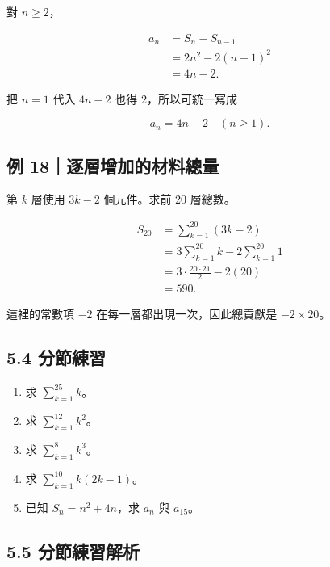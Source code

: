 \documentclass[11pt,a4paper]{article}
\providecommand{\tightlist}{%
  \setlength{\itemsep}{0pt}\setlength{\parskip}{0pt}}
\begin{document}
對 \(n\ge2\)，

\[
\begin{aligned}
a_n&=S_n-S_{n-1}\\
&=2n^2-2(n-1)^2\\
&=4n-2.
\end{aligned}
\]

把 \(n=1\) 代入 \(4n-2\) 也得 \(2\)，所以可統一寫成

\[
\boxed{a_n=4n-2\quad(n\ge1)}.
\]

\subsection{例 18｜逐層增加的材料總量}\label{ux4f8b-18ux9010ux5c64ux589eux52a0ux7684ux6750ux6599ux7e3dux91cf}

第 \(k\) 層使用 \(3k-2\) 個元件。求前 20 層總數。

\[
\begin{aligned}
S_{20}
&=\sum_{k=1}^{20}(3k-2)\\
&=3\sum_{k=1}^{20}k-2\sum_{k=1}^{20}1\\
&=3\cdot\frac{20\cdot21}{2}-2(20)\\
&=590.
\end{aligned}
\]

這裡的常數項 \(-2\) 在每一層都出現一次，因此總貢獻是 \(-2\times20\)。

\subsection{5.4 分節練習}\label{ux5206ux7bc0ux7df4ux7fd2-4}

\begin{enumerate}
\def\labelenumi{\arabic{enumi}.}
\tightlist
\item
  求 \(\displaystyle\sum_{k=1}^{25}k\)。
\item
  求 \(\displaystyle\sum_{k=1}^{12}k^2\)。
\item
  求 \(\displaystyle\sum_{k=1}^{8}k^3\)。
\item
  求 \(\displaystyle\sum_{k=1}^{10}k(2k-1)\)。
\item
  已知 \(S_n=n^2+4n\)，求 \(a_n\) 與 \(a_{15}\)。
\end{enumerate}

\subsection{5.5 分節練習解析}\label{ux5206ux7bc0ux7df4ux7fd2ux89e3ux6790-4}
\end{document}
